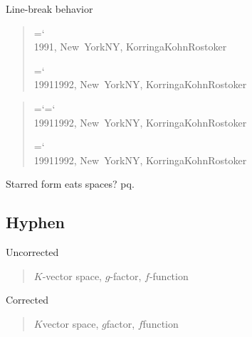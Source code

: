 \documentclass[a4paper]{article}
\newcommand*{\code}[1]{{\ttfamily\hyphenchar\font=`\-\relax #1}}
\newcommand*{\propername}[1]{\mbox{\textsc{\textls[25]{#1}}}}
\newcommand*{\singlequotes}[1]{\singleguillemetright#1\singleguillemetleft}
\begin{document}
\noindent Line-break behavior

\begin{quote}
  \setlength{\overfullrule}{0pt}
  \parbox[t]{0pt}{%
    \code{\string{}}  \\
    1991,
    New~YorkNY,
    KorringaKohnRostoker}
  \hspace{120pt}
  \parbox[t]{0pt}{%
    \code{\string{}}  \\
    19911992,
    New~YorkNY,
    KorringaKohnRostoker}
\end{quote}

\begin{quote}
  \setlength{\overfullrule}{0pt}
  \parbox[t]{0pt}{%
    \code{\string{}}\code{\string\nobreak}  \\
    1991\nobreak{}1992,
    New~York\nobreak{}NY,
    KorringaKohn\nobreak{}Rostoker}
  \hspace{140pt}
  \parbox[t]{0pt}{%
    \code{\string\allowhyphenation\string{}}  \\
    19911992,
    New~YorkNY,
    Korringa\allowhyphenation{}KohnRostoker}
\end{quote}

\noindent Starred form eats spaces?  p  q.

\subsection{Hyphen}

Uncorrected

\begin{quote}
  \(K\)-vector space, \(g\)-factor, \(f\)-function
\end{quote}

\noindent Corrected

\begin{quote}
  \(K\)vector space,
  \(g\)factor,
  \(f\)function
\end{quote}
\end{document}
